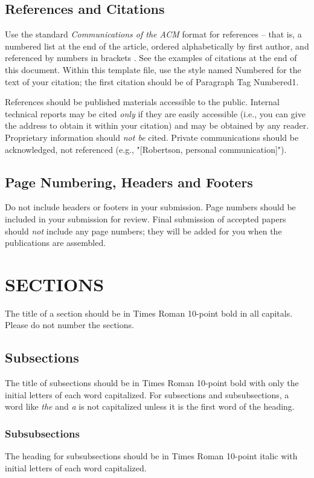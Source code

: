 \subsection{References and Citations}
Use the standard {\it Communications of the ACM} format for 
references -- that is, a numbered list at the end of the 
article, ordered alphabetically by first author, and referenced 
by numbers in brackets \cite{Anderson:Impacts}. See the examples of citations at 
the end of this document. Within this template file, use the 
style named Numbered for the text of your citation; the first 
citation should be of Paragraph Tag Numbered1.

References should be published materials accessible to the 
public. Internal technical reports may be cited {\it only} if they 
are easily accessible (i.e., you can give the address to obtain 
it within your citation) and may be obtained by any reader. 
Proprietary information should {\it not be} cited. Private 
communications should be acknowledged, not referenced 
(e.g., "[Robertson, personal communication]").

\subsection{Page Numbering, Headers and Footers}
Do not include headers or footers in your submission. Page 
numbers should be included in your submission for review. 
Final submission of accepted papers should {\it not} include any 
page numbers; they will be added for you when the 
publications are assembled.

\section{SECTIONS}
The title of a section should be in Times Roman 10-point 
bold in all capitals. Please do not number the sections.

\subsection{Subsections}
The title of subsections should be in Times Roman 10-point 
bold with only the initial letters of each word capitalized. 
For subsections and subsubsections, a word like {\it the} and {\it a} 
is not capitalized unless it is the first word of the heading.

\subsubsection{Subsubsections}
The heading for subsubsections should be in Times Roman 
10-point italic with initial letters of each word capitalized.
 
